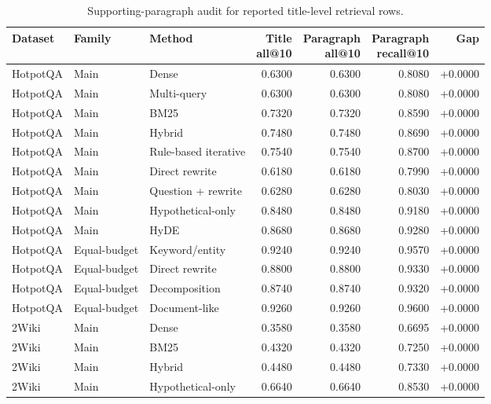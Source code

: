 \begin{table}[t]
\centering
\caption{Supporting-paragraph audit for reported title-level retrieval rows.}
\label{tab:supporting_paragraph_audit}
\footnotesize
\begin{threeparttable}
\setlength{\tabcolsep}{2pt}
\begin{tabularx}{\textwidth}{>{\raggedright\arraybackslash}p{} l >{\raggedright\arraybackslash}X r r r r}
\toprule
Dataset & Family & Method & \shortstack{Title\\all@10} & \shortstack{Paragraph\\all@10} & \shortstack{Paragraph\\recall@10} & Gap \\
\midrule
HotpotQA & Main & Dense & 0.6300 & 0.6300 & 0.8080 & +0.0000 \\
HotpotQA & Main & Multi-query & 0.6300 & 0.6300 & 0.8080 & +0.0000 \\
HotpotQA & Main & BM25 & 0.7320 & 0.7320 & 0.8590 & +0.0000 \\
HotpotQA & Main & Hybrid & 0.7480 & 0.7480 & 0.8690 & +0.0000 \\
HotpotQA & Main & Rule-based iterative & 0.7540 & 0.7540 & 0.8700 & +0.0000 \\
HotpotQA & Main & Direct rewrite & 0.6180 & 0.6180 & 0.7990 & +0.0000 \\
HotpotQA & Main & Question + rewrite & 0.6280 & 0.6280 & 0.8030 & +0.0000 \\
HotpotQA & Main & Hypothetical-only & 0.8480 & 0.8480 & 0.9180 & +0.0000 \\
HotpotQA & Main & HyDE & 0.8680 & 0.8680 & 0.9280 & +0.0000 \\
HotpotQA & Equal-budget & Keyword/entity & 0.9240 & 0.9240 & 0.9570 & +0.0000 \\
HotpotQA & Equal-budget & Direct rewrite & 0.8800 & 0.8800 & 0.9330 & +0.0000 \\
HotpotQA & Equal-budget & Decomposition & 0.8740 & 0.8740 & 0.9320 & +0.0000 \\
HotpotQA & Equal-budget & Document-like & 0.9260 & 0.9260 & 0.9600 & +0.0000 \\
2Wiki & Main & Dense & 0.3580 & 0.3580 & 0.6695 & +0.0000 \\
2Wiki & Main & BM25 & 0.4320 & 0.4320 & 0.7250 & +0.0000 \\
2Wiki & Main & Hybrid & 0.4480 & 0.4480 & 0.7330 & +0.0000 \\
2Wiki & Main & Hypothetical-only & 0.6640 & 0.6640 & 0.8530 & +0.0000 \\

\end{tabularx}
\end{threeparttable}
\end{table}

